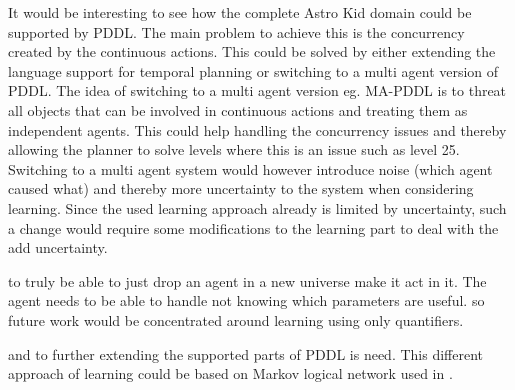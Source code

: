 	It would be interesting to see how the complete Astro Kid domain could be supported by PDDL. The main problem to achieve this is the concurrency created by the continuous actions. This could be solved by either extending the language support for temporal planning or switching to a multi agent version of PDDL. The idea of switching to a multi agent version eg. MA-PDDL is to threat all objects that can be involved in continuous actions and treating them as independent agents. This could help handling the concurrency issues and thereby allowing the planner to solve levels where this is an issue such as level 25. Switching to a multi agent system would however introduce noise (which agent caused what) and thereby more uncertainty to the system when considering learning. Since the used learning approach already is limited by uncertainty, such a change would require some modifications to the learning part to deal with the add uncertainty.  
	

	
 to truly be able to just drop an agent in a new universe make it act in it. The agent needs to be able to handle not knowing which parameters are useful. so future work would be concentrated around learning using only quantifiers. 

		and to further extending the supported parts of PDDL is need. This different approach of learning could be based on Markov logical network used in \cite{zhuo2010a}. 
	